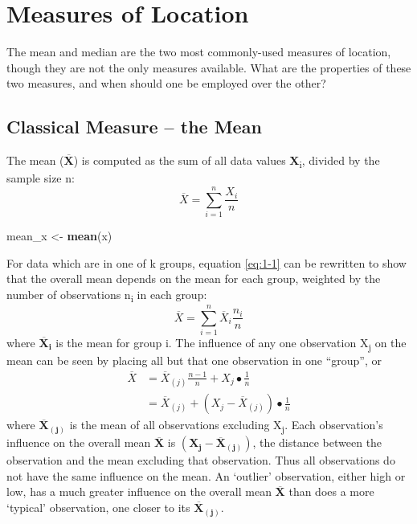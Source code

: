 \documentclass[]{book}
\newenvironment{Shaded}{\begin{snugshade}}{\end{snugshade}}
\newcommand{\KeywordTok}[1]{\textcolor[rgb]{0.13,0.29,0.53}{\textbf{#1}}}
\newcommand{\NormalTok}[1]{#1}
\newcommand{\StringTok}[1]{\textcolor[rgb]{0.31,0.60,0.02}{#1}}
\begin{document}
\hypertarget{measures-of-location}{%
\section{Measures of Location}\label{measures-of-location}}

The mean and median are the two most commonly-used measures of location, though they are
not the only measures available. What are the properties of these two measures, and when
should one be employed over the other?

\hypertarget{classical-measure-the-mean}{%
\subsection{Classical Measure -- the Mean}\label{classical-measure-the-mean}}

The mean (\(\mathbf{\overline{X}}\)) is computed as the sum of all data values \textbf{X}\textsubscript{i}, divided by the sample size n:
\begin{equation}
\overline{X} = \sum_{i=1}^{n} \frac{X_{i}}{n}
\label{eq:1-1}
\end{equation}

\begin{Shaded}
\begin{Highlighting}[]
\NormalTok{mean_x <-}\StringTok{ }\KeywordTok{mean}\NormalTok{(x)}
\end{Highlighting}
\end{Shaded}

For data which are in one of k groups, equation \eqref{eq:1-1} can be rewritten to show that the overall
mean depends on the mean for each group, weighted by the number of observations n\textsubscript{i} in each
group:
\begin{equation}
\overline{X} = \sum_{i=1}^{n} \overline{X}_{i} \frac{n_{i}}{n}
\label{eq:1-2}
\end{equation}
where \(\mathbf{\overline{X}_{i}}\) is the mean for group i. The influence of any one observation X\textsubscript{j} on the mean can be seen by placing all but that one observation in one ``group'', or
\begin{equation}
\begin{split}
\overline{X} & =\overline{X}_{(j)} \frac{n-1}{n} + X_{j} \bullet \frac{1}{n} \\
& =\overline{X}_{(j)} + \left( X_{j} - \overline{X}_{(j)} \right) \bullet \frac{1}{n}
\end{split}
\label{eq:1-3}
\end{equation}
where \(\mathbf{\overline{X}_{(j)}}\) is the mean of all observations excluding X\textsubscript{j}. Each observation's influence on the overall mean \(\mathbf{\overline{X}}\) is \(\left( \mathbf{X_{j} -\overline{X}_{(j)}} \right)\), the distance between the observation and the mean excluding that observation. Thus all observations do not have the same influence on the mean. An `outlier' observation, either high or low, has a much greater influence on the overall mean \(\mathbf{\overline{X}}\) than does a more `typical' observation, one closer to its \(\mathbf{\overline{X}_{(j)}}\).
\end{document}
